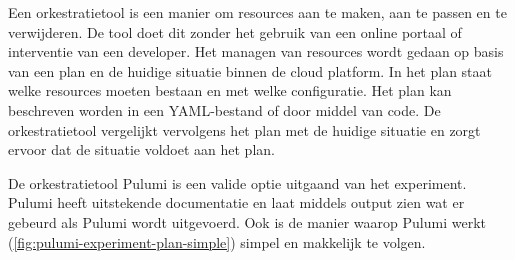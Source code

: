 Een orkestratietool is een manier om resources aan te maken, aan te passen en te verwijderen. De tool doet dit zonder het gebruik van een online portaal of interventie van een developer. Het managen van resources wordt gedaan op basis van een plan en de huidige situatie binnen de cloud platform. In het plan staat welke resources moeten bestaan en met welke configuratie. Het plan kan beschreven worden in een YAML-bestand of door middel van code. De orkestratietool vergelijkt vervolgens het plan met de huidige situatie en zorgt ervoor dat de situatie voldoet aan het plan.

De orkestratietool Pulumi is een valide optie uitgaand van het experiment. Pulumi heeft uitstekende documentatie en laat middels output zien wat er gebeurd als Pulumi wordt uitgevoerd. Ook is de manier waarop Pulumi werkt (\autoref{fig:pulumi-experiment-plan-simple}) simpel en makkelijk te volgen.